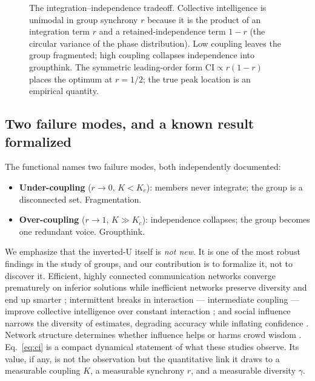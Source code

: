 \documentclass[11pt]{article}
\begin{document}
\begin{figure}[ht]
\centering
{}
\caption{The integration--independence tradeoff. Collective intelligence is unimodal in group synchrony $r$ because it is the product of an integration term $r$ and a retained-independence term $1-r$ (the circular variance of the phase distribution). Low coupling leaves the group fragmented; high coupling collapses independence into groupthink. The symmetric leading-order form $\mathrm{CI}\propto r(1-r)$ places the optimum at $r=1/2$; the true peak location is an empirical quantity.}
\label{fig:ci}
\end{figure}

\subsection{Two failure modes, and a known result formalized}

The functional names two failure modes, both independently documented:
\begin{itemize}
  \item \textbf{Under-coupling} ($r \to 0$, $K < K_c$): members never integrate; the group is a disconnected set. Fragmentation.
  \item \textbf{Over-coupling} ($r \to 1$, $K \gg K_c$): independence collapses; the group becomes one redundant voice. Groupthink.
\end{itemize}
We emphasize that the inverted-U itself is \emph{not new}. It is one of the most robust findings in the study of groups, and our contribution is to formalize it, not to discover it. Efficient, highly connected communication networks converge prematurely on inferior solutions while inefficient networks preserve diversity and end up smarter \citep{lazer2007network}; intermittent breaks in interaction --- intermediate coupling --- improve collective intelligence over constant interaction \citep{bernstein2018intermittent}; and social influence narrows the diversity of estimates, degrading accuracy while inflating confidence \citep{lorenz2011social}. Network structure determines whether influence helps or harms crowd wisdom \citep{becker2017network}. Eq.~\eqref{eq:ci} is a compact dynamical statement of what these studies observe. Its value, if any, is not the observation but the quantitative link it draws to a measurable coupling $K$, a measurable synchrony $r$, and a measurable diversity $\gamma$.
\end{document}
